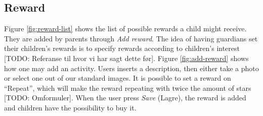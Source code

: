 \subsection{Reward}
\label{sec:description-manage-rewards}
Figure \ref{fig:reward-list} shows the list of possible rewards a child might receive. They are added by parents through \emph{Add reward}. The idea of having guardians set their children's rewards is to specify rewards according to children's interest [TODO: Referanse til hvor vi har sagt dette før]. Figure \ref{fig:add-reward} shows how one may add an activity. Users inserts a description, then either take a photo or select one out of our standard images. It is possible to set a reward on ``Repeat'', which will make the reward repeating with twice the amount of stars [TODO: Omformuler].        
When the user press \emph{Save} (Lagre), the reward is added and children have the possibility to buy it. 
 

